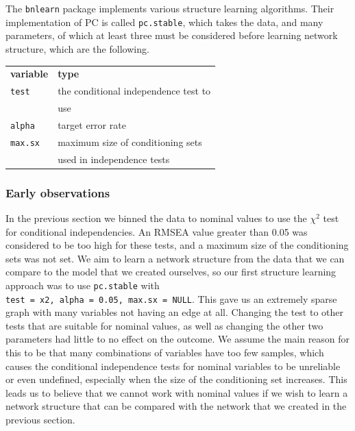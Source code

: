 \documentclass[11pt,]{article}
\begin{document}
\begin{multicols}{2}
The \texttt{bnlearn} package implements various structure learning
algorithms. Their implementation of PC is called \texttt{pc.stable},
which takes the data, and many parameters, of which at least three must
be considered before learning network structure, which are the
following.

\medskip
\begin{tabular}{ll}
    \textbf{variable}   & \textbf{type} \\
    \texttt{test}       & the conditional independence test to \\
                        & use \\
    \texttt{alpha}      & target error rate \\
    \texttt{max.sx}     & maximum size of conditioning sets \\
                        & used in independence tests \\
\end{tabular}
\medskip

\hypertarget{early-observations}{%
\subsubsection{Early observations}\label{early-observations}}

In the previous section we binned the data to nominal values to use the
\(\chi^2\) test for conditional independencies. An RMSEA value greater
than 0.05 was considered to be too high for these tests, and a maximum
size of the conditioning sets was not set. We aim to learn a network
structure from the data that we can compare to the model that we created
ourselves, so our first structure learning approach was to use
\texttt{pc.stable} with
\texttt{test\ =\ \textquotesingle{}x2\textquotesingle{},\ alpha\ =\ 0.05,\ max.sx\ =\ NULL}.
This gave us an extremely sparse graph with many variables not having an
edge at all. Changing the test to other tests that are suitable for
nominal values, as well as changing the other two parameters had little
to no effect on the outcome. We assume the main reason for this to be
that many combinations of variables have too few samples, which causes
the conditional independence tests for nominal variables to be
unreliable or even undefined, especially when the size of the
conditioning set increases. This leads us to believe that we cannot work
with nominal values if we wish to learn a network structure that can be
compared with the network that we created in the previous section.


\end{multicols}
\end{document}
